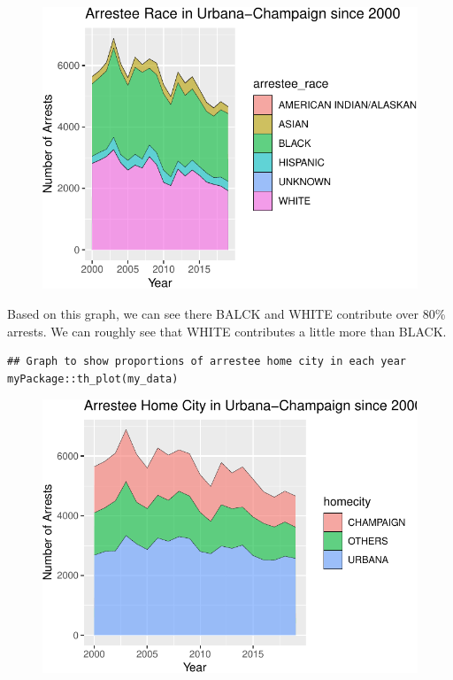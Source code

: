 \documentclass[
  article]{jss}
\begin{document}
\begin{figure}[H]

{\centering \includegraphics{final-report_files/figure-pdf/unnamed-chunk-10-1.pdf}

}

\end{figure}

Based on this graph, we can see there BALCK and WHITE contribute over
80\% arrests. We can roughly see that WHITE contributes a little more
than BLACK.

\begin{verbatim}
## Graph to show proportions of arrestee home city in each year
myPackage::th_plot(my_data)
\end{verbatim}

\begin{figure}[H]

{\centering \includegraphics{final-report_files/figure-pdf/unnamed-chunk-11-1.pdf}

}

\end{figure}
\end{document}

